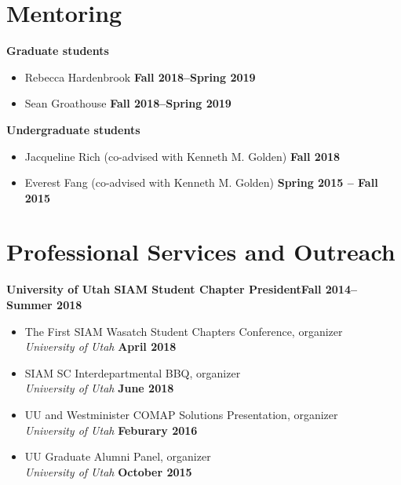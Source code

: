 \documentclass[margin,line]{res}
\begin{document}
\begin{resume}
\section{\sc Mentoring}
{\bf Graduate students}
\begin{itemize}
\item[ ] Rebecca Hardenbrook
\hfill {\bf Fall 2018--Spring 2019}
\item [] Sean Groathouse
\hfill {\bf Fall 2018--Spring 2019}
\end{itemize}
{\bf Undergraduate students}
\begin{itemize}
\item[ ] Jacqueline Rich (co-advised with Kenneth M. Golden) 
\hfill {\bf Fall 2018}
\item[ ] Everest Fang (co-advised with Kenneth M. Golden)
\hfill {\bf Spring 2015 -- Fall 2015}
\end{itemize}

\section{\sc Professional Services and Outreach}

{\bf University of Utah SIAM Student Chapter President}\hfill{\bf Fall 2014--Summer 2018}
\begin{itemize}
\item[ ] The First SIAM Wasatch Student Chapters Conference, organizer
\\ {\it University of Utah} \hfill {\bf April 2018}
\item[ ] SIAM SC Interdepartmental BBQ, organizer
\\ {\it University of Utah} \hfill {\bf June 2018}
\item[ ] UU and Westminister COMAP Solutions Presentation, organizer
\\ {\it University of Utah} \hfill {\bf Feburary 2016}
\item[ ] UU Graduate Alumni Panel, organizer 
\\ {\it University of Utah} \hfill {\bf October 2015}
\end{itemize}


\end{resume}
\end{document}
